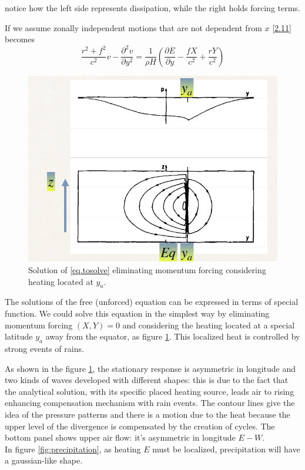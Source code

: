 notice how the left side represents dissipation, while the right holds forcing terms. 

If we assume zonally independent motions that are not dependent from $x$ \ref{2.11} becomes 
\begin{equation}\label{eq.tosolve}
    \frac{r^2 + f^2}{c^2} v - \frac{\partial^2 v}{\partial y^2} = \frac{1}{\rho H} \left( \frac{\partial E}{\partial y} - \frac{fX}{c^2} + \frac{rY}{c^2} \right)
\end{equation}
\begin{figure}[htpb]
    \centering
    \includegraphics[width=0.35\linewidth]{uploads/60image.png}
    \caption{Solution of \ref{eq.tosolve} eliminating momentum forcing considering heating located at $y_a$.}
    \label{fig:sol}
\end{figure}
The solutions of the free (unforced) equation can be expressed in terms of special function. We could solve this equation in the simplest way by eliminating momentum forcing $(X,Y)=0$ and considering the heating located at a special latitude $y_a$ away from the equator, as figure \ref{fig:sol}. This localized heat is controlled by strong events of rains. 

As shown in the figure \ref{fig:sol}, the stationary response is asymmetric in longitude and two kinds of waves developed with different shapes: this is due to the fact that the analytical solution, with its specific placed heating source, leads air to rising enhancing compensation mechanism with rain events.
The contour lines give the idea of the pressure patterns and there is a motion due to the heat because the upper level of the divergence is compensated by the creation of cycles. The bottom panel shows upper air flow: it's asymmetric in longitude $E-W$. \\

In figure \ref{fig:precipitation}, as heating $E$ must be localized, precipitation will have a gaussian-like shape. 

